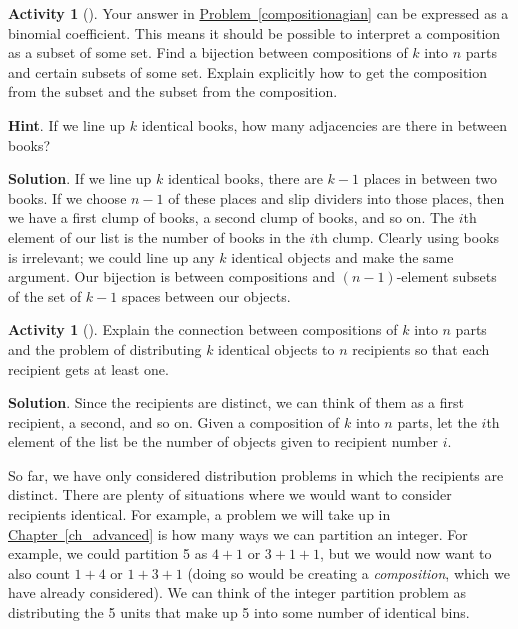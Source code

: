\documentclass[10pt,]{book}
\theoremstyle{plain}
\theoremstyle{definition}
\theoremstyle{definition}
\theoremstyle{definition}
\newtheorem{activity}[project]{Activity}
\theoremstyle{definition}
\numberwithin{equation}{chapter}
\begin{document}
\begin{activity}[]\label{activity-72}
\hypertarget{p-770}{}%
Your answer in \hyperref[compositionagian]{Problem~\ref{compositionagian}} can be expressed as a binomial coefficient. This means it should be possible to interpret a composition as a subset of some set. Find a bijection between compositions of \(k\) into \(n\) parts and certain subsets of some set.  Explain explicitly how to get the composition from the subset and the subset from the composition.%
\par\smallskip%
\noindent\textbf{Hint}.\hypertarget{hint-64}{}\quad%
\hypertarget{p-771}{}%
If we line up \(k\) identical books, how many adjacencies are there in between books?%
\par\smallskip%
\noindent\textbf{Solution}.\hypertarget{solution-73}{}\quad%
\hypertarget{p-772}{}%
If we line up \(k\) identical books, there are \(k-1\) places in between two books. If we choose \(n-1\) of these places and slip dividers into those places, then we have a first clump of books, a second clump of books, and so on. The \(i\)th element of our list is the number of books in the \(i\)th clump. Clearly using books is irrelevant; we could line up any \(k\) identical objects and make the same argument. Our bijection is between compositions and \((n-1)\)-element subsets of the set of \(k-1\) spaces between our objects.%
\end{activity}
\begin{activity}[]\label{activity-73}
\hypertarget{p-773}{}%
Explain the connection between compositions of \(k\) into \(n\) parts and the problem of distributing \(k\) identical objects to \(n\) recipients so that each recipient gets at least one.%
\par\smallskip%
\noindent\textbf{Solution}.\hypertarget{solution-74}{}\quad%
\hypertarget{p-774}{}%
Since the recipients are distinct, we can think of them as a first recipient, a second, and so on. Given a composition of \(k\) into \(n\) parts, let the \(i\)th element of the list be the number of objects given to recipient number \(i\).%
\end{activity}
\hypertarget{p-775}{}%
So far, we have only considered distribution problems in which the recipients are distinct.  There are plenty of situations where we would want to consider recipients identical.  For example, a problem we will take up in \hyperref[ch_advanced]{Chapter~\ref{ch_advanced}} is how many ways we can partition an integer.  For example, we could partition 5 as \(4+1\) or \(3+1+1\), but we would now want to also count \(1+4\) or \(1+3+1\) (doing so would be creating a \emph{composition}, which we have already considered).  We can think of the integer partition problem as distributing the 5 units that make up 5 into some number of identical bins.%
\end{document}
